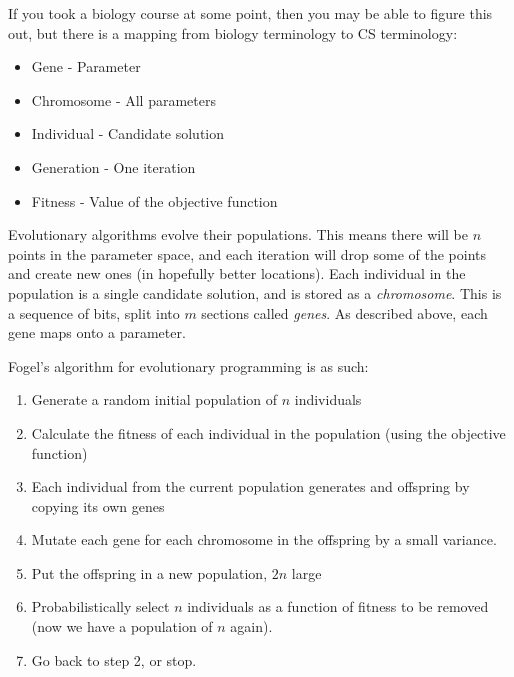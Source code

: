 If you took a biology course at some point, then you may be able to figure this
out, but there is a mapping from biology terminology to CS terminology:

\begin{itemize}
  \item Gene  - Parameter
  \item Chromosome - All parameters
  \item Individual - Candidate solution
  \item Generation - One iteration
  \item Fitness - Value of the objective function
\end{itemize}

Evolutionary algorithms evolve their populations. This means there will be $n$
points in the parameter space, and each iteration will drop some of the points
and create new ones (in hopefully better locations). Each individual in the 
population is a single candidate solution, and is stored as a
\textit{chromosome}. This is a sequence of bits, split into $m$ sections called
\textit{genes}. As described above, each gene maps onto a parameter.

\begin{center}
\end{center}

Fogel's algorithm for evolutionary programming is as such:

\begin{enumerate}
  \item Generate a random initial population of $n$ individuals
  \item Calculate the fitness of each individual in the population (using the
  objective function)
  \item Each individual from the current population generates and offspring by
  copying its own genes
  \item Mutate each gene for each chromosome in the offspring by a small 
  variance.
  \item Put the offspring in a new population, $2n$ large
  \item Probabilistically select $n$ individuals as a function of fitness to be
  removed (now we have a population of $n$ again).
  \item Go back to step 2, or stop.
\end{enumerate}

